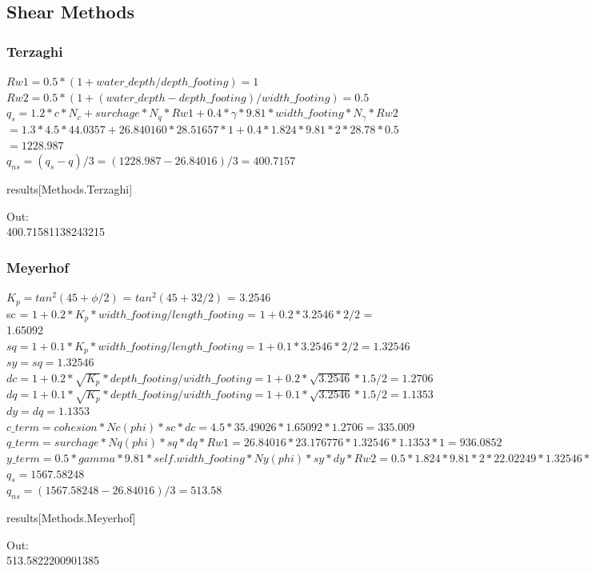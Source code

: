 \subsection{Shear Methods}

\subsubsection{Terzaghi}
$Rw1 = 0.5* (1+water\_depth/depth\_footing) = 1$\\
$Rw2 = 0.5* (1+(water\_depth-depth\_footing)/width\_footing) = 0.5$\\
$q_s = 1.2*c*N_c + surchage*N_q*Rw1 + 0.4*\gamma*9.81*width\_footing*N_\gamma*Rw2$\\
$=1.3*4.5*44.0357+26.840160*28.51657*1+0.4*1.824*9.81*2*28.78*0.5$\\
$=1228.987$\\
$q_{ns} = (q_s - q)/3 = (1228.987-26.84016)/3=400.7157$\\
\begin{python}
results[Methods.Terzaghi]
\end{python}
Out:\\
400.71581138243215

\subsubsection{Meyerhof}
$K_p = tan^2(45+ \phi/2)$ = $tan^2(45+32/2)$ = 3.2546\\
sc = $1 + 0.2*K_p*width\_footing/length\_footing$ = $1+0.2*3.2546*2/2$ = 1.65092\\
$sq=1+0.1*K_p*width\_footing/length\_footing = 1+0.1*3.2546*2/2 = 1.32546$\\
$sy = sq = 1.32546$\\
$dc = 1 +0.2*\sqrt{K_p}*depth\_footing/width\_footing = 1+0.2*\sqrt{3.2546}*1.5/2 = 1.2706$\\
$dq =1 +0.1*\sqrt{K_p}*depth\_footing/width\_footing = 1+0.1*\sqrt{3.2546}*1.5/2 = 1.1353$\\
$dy = dq = 1.1353$\\
$c\_term = cohesion*Nc(phi)*sc*dc = 4.5*35.49026*1.65092*1.2706 = 335.009$\\
$q\_term = surchage*Nq(phi)*sq*dq*Rw1 = 26.84016*23.176776*1.32546*1.1353*1 = 936.0852$\\
$y\_term = 0.5*gamma*9.81*self.width\_footing*Ny(phi)*sy*dy*Rw2 = 0.5*1.824*9.81*2*22.02249*1.32546*1.1353*0.5 = 296.488$\\
$q_s=1567.58248$\\
$q_{ns}=(1567.58248-26.84016)/3=513.58$
\begin{python}
results[Methods.Meyerhof]
\end{python}
Out:\\
513.5822200901385

